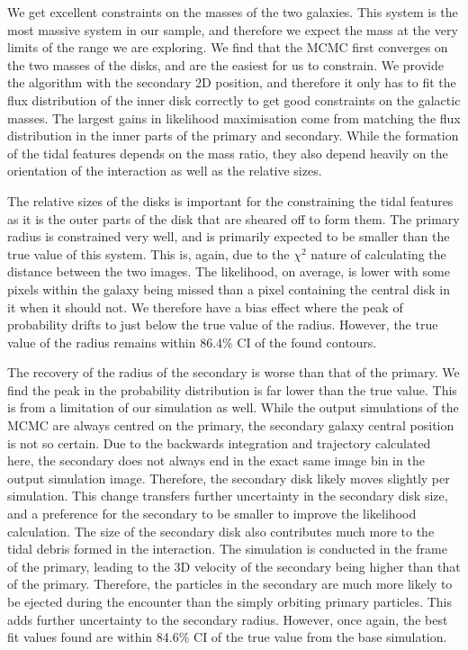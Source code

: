 We get excellent constraints on the masses of the two galaxies. This system is the most massive system in our sample, and therefore we expect the mass at the very limits of the range we are exploring. We find that the MCMC first converges on the two masses of the disks, and are the easiest for us to constrain. We provide the algorithm with the secondary 2D position, and therefore it only has to fit the flux distribution of the inner disk correctly to get good constraints on the galactic masses. The largest gains in likelihood maximisation come from matching the flux distribution in the inner parts of the primary and secondary. While the formation of the tidal features depends on the mass ratio, they also depend heavily on the orientation of the interaction as well as the relative sizes.

The relative sizes of the disks is important for the constraining the tidal features as it is the outer parts of the disk that are sheared off to form them. The primary radius is constrained very well, and is primarily expected to be smaller than the true value of this system. This is, again, due to the $\chi^{2}$ nature of calculating the distance between the two images. The likelihood, on average, is lower with some pixels within the galaxy being missed than a pixel containing the central disk in it when it should not. We therefore have a bias effect where the peak of probability drifts to just below the true value of the radius. However, the true value of the radius remains within 86.4\% CI of the found contours. 

The recovery of the radius of the secondary is worse than that of the primary. We find the peak in the probability distribution is far lower than the true value. This is from a limitation of our simulation as well. While the output simulations of the MCMC are always centred on the primary, the secondary galaxy central position is not so certain. Due to the backwards integration and trajectory calculated here, the secondary does not always end in the exact same image bin in the output simulation image. Therefore, the secondary disk likely moves slightly per simulation. This change transfers further uncertainty in the secondary disk size, and a preference for the secondary to be smaller to improve the likelihood calculation. The size of the secondary disk also contributes much more to the tidal debris formed in the interaction. The simulation is conducted in the frame of the primary, leading to the 3D velocity of the secondary being higher than that of the primary. Therefore, the particles in the secondary are much more likely to be ejected during the encounter than the simply orbiting primary particles. This adds further uncertainty to the secondary radius. However, once again, the best fit values found are within 84.6\% CI of the true value from the base simulation. 

